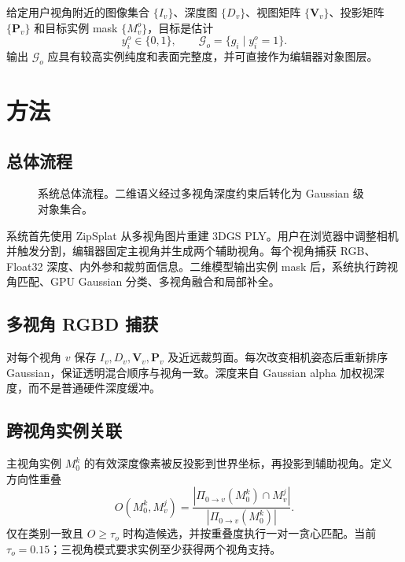 \documentclass[10pt,twocolumn]{ctexart}
\begin{document}
给定用户视角附近的图像集合 $\{I_v\}$、深度图 $\{D_v\}$、视图矩阵 $\{\mathbf{V}_v\}$、投影矩阵 $\{\mathbf{P}_v\}$ 和目标实例 mask $\{M_v^o\}$，目标是估计
\begin{equation}
y_i^o\in\{0,1\},\qquad
\mathcal{G}_o=\{g_i\mid y_i^o=1\}.
\end{equation}
输出 $\mathcal{G}_o$ 应具有较高实例纯度和表面完整度，并可直接作为编辑器对象图层。

\section{方法}

\subsection{总体流程}

\begin{figure}[t]
\centering
{}
\caption{系统总体流程。二维语义经过多视角深度约束后转化为 Gaussian 级对象集合。}
\label{fig:pipeline}
\end{figure}

系统首先使用 ZipSplat 从多视角图片重建 3DGS PLY。用户在浏览器中调整相机并触发分割，编辑器固定主视角并生成两个辅助视角。每个视角捕获 RGB、Float32 深度、内外参和裁剪面信息。二维模型输出实例 mask 后，系统执行跨视角匹配、GPU Gaussian 分类、多视角融合和局部补全。

\subsection{多视角 RGBD 捕获}

对每个视角 $v$ 保存 $I_v,D_v,\mathbf{V}_v,\mathbf{P}_v$ 及近远裁剪面。每次改变相机姿态后重新排序 Gaussian，保证透明混合顺序与视角一致。深度来自 Gaussian alpha 加权视深度，而不是普通硬件深度缓冲。

\subsection{跨视角实例关联}

主视角实例 $M_0^k$ 的有效深度像素被反投影到世界坐标，再投影到辅助视角。定义方向性重叠
\begin{equation}
O(M_0^k,M_v^j)=
\frac{|\Pi_{0\rightarrow v}(M_0^k)\cap M_v^j|}
{|\Pi_{0\rightarrow v}(M_0^k)|}.
\end{equation}
仅在类别一致且 $O\geq\tau_o$ 时构造候选，并按重叠度执行一对一贪心匹配。当前 $\tau_o=0.15$；三视角模式要求实例至少获得两个视角支持。
\end{document}
